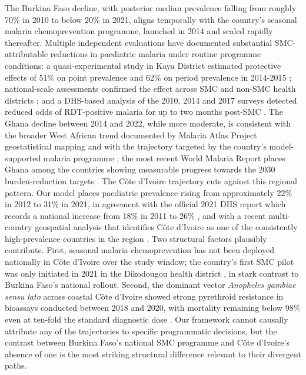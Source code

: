 \documentclass{article}
\begin{document}
The Burkina Faso decline, with posterior median prevalence falling from
roughly 70\% in 2010 to below 20\% in 2021, aligns temporally with the
country's seasonal malaria chemoprevention programme, launched in 2014
and scaled rapidly thereafter. Multiple independent evaluations have
documented substantial SMC-attributable reductions in paediatric malaria
under routine programme conditions: a quasi-experimental study in Kaya
District estimated protective effects of 51\% on point prevalence and
62\% on period prevalence in 2014-2015 \citep{druetz2018};
national-scale assessments confirmed the effect across SMC and non-SMC
health districts \citep{kirakoya2022}; and a DHS-based analysis of the
2010, 2014 and 2017 surveys detected reduced odds of RDT-positive
malaria for up to two months post-SMC \citep{cola2022}. The Ghana
decline between 2014 and 2022, while more moderate, is consistent with
the broader West African trend documented by Malaria Atlas Project
geostatistical mapping \citep{bhatt2015, weiss2020} and with the
trajectory targeted by the country's model-supported malaria programme
\citep{awine2017}; the most recent World Malaria Report places Ghana
among the countries showing measurable progress towards the 2030
burden-reduction targets \citep{who2024}. The Côte d'Ivoire trajectory
cuts against this regional pattern. Our model places paediatric
prevalence rising from approximately 22\% in 2012 to 31\% in 2021, in
agreement with the official 2021 DHS report which records a national
increase from 18\% in 2011 to 26\% \citep{civdhs2021}, and with a recent
multi-country geospatial analysis that identifies Côte d'Ivoire as one
of the consistently high-prevalence countries in the region
\citep{aide2025}. Two structural factors plausibly contribute. First,
seasonal malaria chemoprevention has not been deployed nationally in
Côte d'Ivoire over the study window; the country's first SMC pilot was
only initiated in 2021 in the Dikodougou health district
\citep{kangah2024}, in stark contrast to Burkina Faso's national
rollout. Second, the dominant vector \emph{Anopheles gambiae sensu lato}
across coastal Côte d'Ivoire showed strong pyrethroid resistance in
bioassays conducted between 2018 and 2020, with mortality remaining
below 98\% even at ten-fold the standard diagnostic dose
\citep{yokoly2024}. Our framework cannot causally attribute any of the
trajectories to specific programmatic decisions, but the contrast
between Burkina Faso's national SMC programme and Côte d'Ivoire's
absence of one is the most striking structural difference relevant to
their divergent paths.
\end{document}
